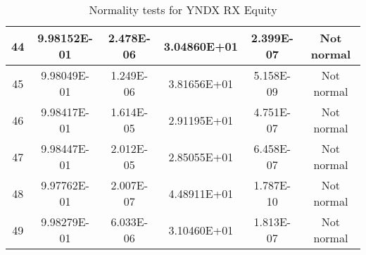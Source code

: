 \begin{table}[h]
\begin{tabular}{|c|c|c|c|c|c|}
		44 & 9.98152E-01 & 2.478E-06 & 3.04860E+01 & 2.399E-07 & Not normal\\\hline
		45 & 9.98049E-01 & 1.249E-06 & 3.81656E+01 & 5.158E-09 & Not normal\\\hline
		46 & 9.98417E-01 & 1.614E-05 & 2.91195E+01 & 4.751E-07 & Not normal\\\hline
		47 & 9.98447E-01 & 2.012E-05 & 2.85055E+01 & 6.458E-07 & Not normal\\\hline
		48 & 9.97762E-01 & 2.007E-07 & 4.48911E+01 & 1.787E-10 & Not normal\\\hline
		49 & 9.98279E-01 & 6.033E-06 & 3.10460E+01 & 1.813E-07 & Not normal\\\hline
	\end{tabular}
	\caption{Normality tests for YNDX RX Equity}
	\label{tab:normality_tests_YNDX_RX}
\end{table}
